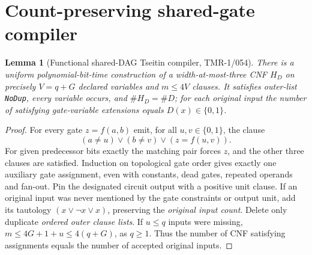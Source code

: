 \documentclass[11pt]{article}
\newtheorem{lemma}{Lemma}
\begin{document}
\section{Count-preserving shared-gate compiler}
\begin{lemma}[Functional shared-DAG Tseitin compiler, TMR-1/054]
There is a uniform polynomial-bit-time construction of a width-at-most-three CNF $H_D$ on precisely $V=q+G$ declared variables and $m\le4V$ clauses. It satisfies outer-list \texttt{NoDup}, every variable occurs, and $\#H_D=\#D$; for each original input the number of satisfying gate-variable extensions equals $D(x)\in\{0,1\}$.
\end{lemma}
\begin{proof}
For every gate $z=f(a,b)$ emit, for all $u,v\in\{0,1\}$, the clause
\[
 (a\ne u)\lor(b\ne v)\lor(z=f(u,v)).
\]
For given predecessor bits exactly the matching pair forces $z$, and the other three clauses are satisfied. Induction on topological gate order gives exactly one auxiliary gate assignment, even with constants, dead gates, repeated operands and fan-out. Pin the designated circuit output with a positive unit clause. If an original input was never mentioned by the gate constraints or output unit, add its tautology $(x\lor\neg x\lor x)$, preserving the \emph{original input count}. Delete only duplicate \emph{ordered outer clause lists}. If $u\le q$ inputs were missing, $m\le4G+1+u\le4(q+G)$, as $q\ge1$. Thus the number of CNF satisfying assignments equals the number of accepted original inputs.
\end{proof}
\end{document}
